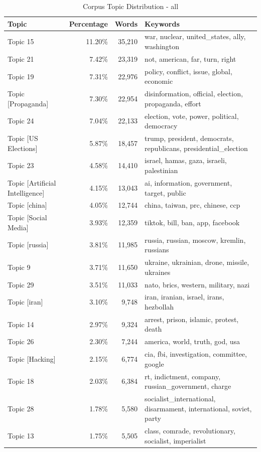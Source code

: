 \begin{table}
\centering
\small
\caption{Corpus Topic Distribution - all}
\label{tab:corpus_topic_dist_all}
\begin{tabular}{lrrp{7cm}}
\toprule
Topic & Percentage & Words & Keywords \\
\midrule
Topic 15 & 11.20\% & 35,210 & war, nuclear, united\_states, ally, washington \\
Topic 21 & 7.42\% & 23,319 & not, american, far, turn, right \\
Topic 19 & 7.31\% & 22,976 & policy, conflict, issue, global, economic \\
Topic [Propaganda] & 7.30\% & 22,954 & disinformation, official, election, propaganda, effort \\
Topic 24 & 7.04\% & 22,133 & election, vote, power, political, democracy \\
Topic [US Elections] & 5.87\% & 18,457 & trump, president, democrats, republicans, presidential\_election \\
Topic 23 & 4.58\% & 14,410 & israel, hamas, gaza, israeli, palestinian \\
Topic [Artificial Intelligence] & 4.15\% & 13,043 & ai, information, government, target, public \\
Topic [china] & 4.05\% & 12,744 & china, taiwan, prc, chinese, ccp \\
Topic [Social Media] & 3.93\% & 12,359 & tiktok, bill, ban, app, facebook \\
Topic [russia] & 3.81\% & 11,985 & russia, russian, moscow, kremlin, russians \\
Topic 9 & 3.71\% & 11,650 & ukraine, ukrainian, drone, missile, ukraines \\
Topic 29 & 3.51\% & 11,033 & nato, brics, western, military, nazi \\
Topic [iran] & 3.10\% & 9,748 & iran, iranian, israel, irans, hezbollah \\
Topic 14 & 2.97\% & 9,324 & arrest, prison, islamic, protest, death \\
Topic 26 & 2.30\% & 7,244 & america, world, truth, god, usa \\
Topic [Hacking] & 2.15\% & 6,774 & cia, fbi, investigation, committee, google \\
Topic 18 & 2.03\% & 6,384 & rt, indictment, company, russian\_government, charge \\
Topic 28 & 1.78\% & 5,580 & socialist\_international, disarmament, international, soviet, party \\
Topic 13 & 1.75\% & 5,505 & class, comrade, revolutionary, socialist, imperialist \\

\end{tabular}
\end{table}
